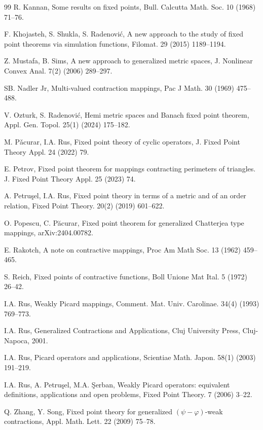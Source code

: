 \documentclass[letterpaper,12pt]{article}
\numberwithin{equation}{section}
\theoremstyle{definition}
\theoremstyle{remark}
\begin{document}
\begin{thebibliography}{99}
R. Kannan,  Some results on fixed points, Bull. Calcutta Math. Soc. 10 (1968) 71--76.


F. Khojasteh, S. Shukla, S. Radenovi\'c, A new approach to the study of fixed point theorems via simulation functions, Filomat. 29 (2015) 1189--1194.

Z. Mustafa, B. Sims, A new approach to generalized metric spaces, J. Nonlinear Convex Anal. 7(2) (2006) 289--297.


SB.  Nadler Jr,  Multi-valued contraction mappings, Pac J Math. 30 (1969) 475--488.

V. Ozturk, S. Radenovi\'c, Hemi metric spaces and Banach fixed point theorem, Appl. Gen. Topol. 25(1) (2024) 175--182.


M. P\v{a}curar, I.A. Rus,  Fixed point theory of cyclic operators, J. Fixed Point Theory Appl. 24 (2022) 79.

E. Petrov, Fixed point theorem for mappings contracting perimeters of triangles. J. Fixed Point Theory Appl. 25 (2023) 74.

A. Petru\c{s}el, I.A. Rus,  Fixed point theory in terms of a metric and of an order relation, Fixed Point Theory. 20(2) (2019) 601--622.

O. Popescu, C. P\u{a}curar,  Fixed point theorem for generalized Chatterjea type mappings, arXiv:2404.00782.

E. Rakotch, A note on contractive mappings, Proc Am Math Soc. 13 (1962) 459--465.

S. Reich,  Fixed points of contractive functions, Boll Unione Mat Ital. 5 (1972) 26--42.

I.A.  Rus,  Weakly Picard mappings, Comment. Mat. Univ. Carolinae. 34(4) (1993) 769--773.


I.A.  Rus,  Generalized Contractions and Applications, Cluj University Press,
Cluj-Napoca, 2001.



I.A.  Rus,  Picard operators and applications, Scientiae Math. Japon. 58(1)  (2003)
 191--219.

I.A. Rus, A. Petru\c{s}el, M.A. \c{S}erban, Weakly Picard operators: equivalent definitions, applications and open problems, Fixed Point Theory. 7 (2006) 3--22.



Q. Zhang, Y. Song, Fixed point theory for generalized $(\psi-\varphi)$-weak contractions, Appl. Math. Lett. 22 (2009) 75--78.


\end{thebibliography}
\end{document}
